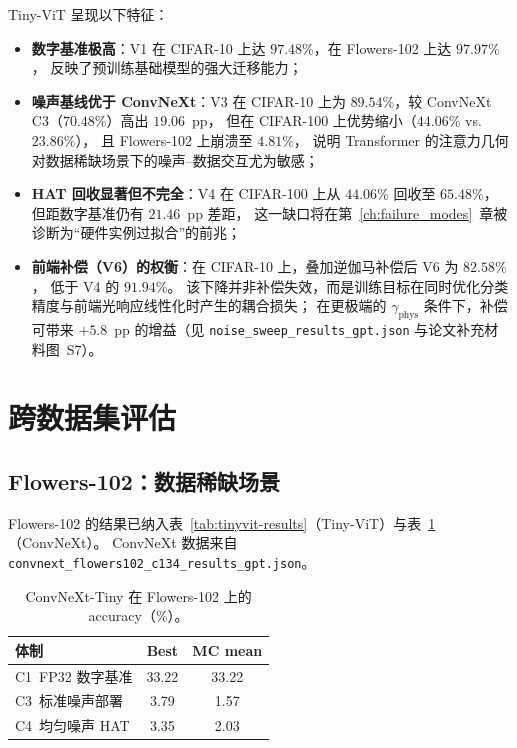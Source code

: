 Tiny-ViT 呈现以下特征：
\begin{itemize}
    \item \textbf{数字基准极高}：V1 在 CIFAR-10 上达 $97.48\%$，在 Flowers-102 上达 $97.97\%$，
    反映了预训练基础模型的强大迁移能力；
    \item \textbf{噪声基线优于 ConvNeXt}：V3 在 CIFAR-10 上为 $89.54\%$，较 ConvNeXt C3（$70.48\%$）高出 $19.06$~pp，
    但在 CIFAR-100 上优势缩小（$44.06\%$ vs.~$23.86\%$），
    且 Flowers-102 上崩溃至 $4.81\%$，
    说明 Transformer 的注意力几何对数据稀缺场景下的噪声--数据交互尤为敏感；
    \item \textbf{HAT 回收显著但不完全}：V4 在 CIFAR-100 上从 $44.06\%$ 回收至 $65.48\%$，
    但距数字基准仍有 $21.46$~pp 差距，
    这一缺口将在第~\ref{ch:failure_modes}~章被诊断为``硬件实例过拟合''的前兆；
    \item \textbf{前端补偿（V6）的权衡}：在 CIFAR-10 上，叠加逆伽马补偿后 V6 为 $82.58\%$，
    低于 V4 的 $91.94\%$。
    该下降并非补偿失效，而是训练目标在同时优化分类精度与前端光响应线性化时产生的耦合损失；
    在更极端的 $\gamma_{\mathrm{phys}}$ 条件下，补偿可带来 $+5.8$~pp 的增益（见 \texttt{noise\_sweep\_results\_gpt.json} 与论文补充材料图~S7）。
\end{itemize}

\section{跨数据集评估}

\subsection{Flowers-102：数据稀缺场景}

Flowers-102 的结果已纳入表~\ref{tab:tinyvit-results}（Tiny-ViT）与表~\ref{tab:convnext-flowers}（ConvNeXt）。
ConvNeXt 数据来自 \texttt{convnext\_flowers102\_c134\_results\_gpt.json}。

\begin{table}[htbp]
\centering
\caption{ConvNeXt-Tiny 在 Flowers-102 上的 accuracy（\%）。}
\label{tab:convnext-flowers}
\begin{tabular}{@{}lcc@{}}
\toprule
\textbf{体制} & \textbf{Best} & \textbf{MC mean} \\
\midrule
C1~FP32 数字基准 & 33.22 & 33.22 \\
C3~标准噪声部署 & 3.79 & 1.57 \\
C4~均匀噪声 HAT & 3.35 & 2.03 \\
\bottomrule
\end{tabular}
\end{table}


